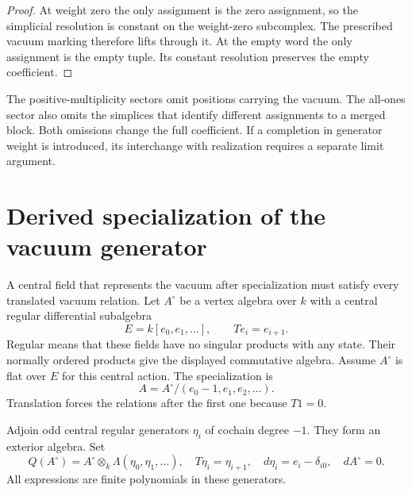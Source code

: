 \begin{proof}
At weight zero the only assignment is the zero assignment, so
the simplicial resolution is constant on the weight-zero
subcomplex.  The prescribed vacuum marking therefore lifts
through it.  At the empty word the only assignment is the empty
tuple.  Its constant resolution preserves the empty coefficient.
\end{proof}

The positive-multiplicity sectors omit positions carrying the
vacuum.  The all-ones sector also omits the simplices that identify
different assignments to a merged block.  Both omissions change
the full coefficient.  If a completion in generator weight is
introduced, its interchange with realization requires a separate
limit argument.

\section{Derived specialization of the vacuum generator}

A central field that represents the vacuum after specialization
must satisfy every translated vacuum relation.  Let \(A^\circ\)
be a vertex algebra over \(k\) with a central regular differential
subalgebra
\[
 E=k[e_0,e_1,\ldots],\qquad Te_i=e_{i+1}.
\]
Regular means that these fields have no singular products with
any state.  Their normally ordered products give the displayed
commutative algebra.  Assume \(A^\circ\) is flat over \(E\) for
this central action.  The specialization is
\[
 A=A^\circ/(e_0-1,e_1,e_2,\ldots).
\]
Translation forces the relations after the first one because
\(T1=0\).

Adjoin odd central regular generators \(\eta_i\) of cochain
degree \(-1\).  They form an exterior algebra.  Set
\begin{equation}
 Q(A^\circ)=A^\circ\otimes_k\Lambda(\eta_0,\eta_1,\ldots),
 \quad T\eta_i=\eta_{i+1},\quad
 d\eta_i=e_i-\delta_{i0},\quad dA^\circ=0.
 \label{eq:vacuum-derived-specialization}
\end{equation}
All expressions are finite polynomials in these generators.

